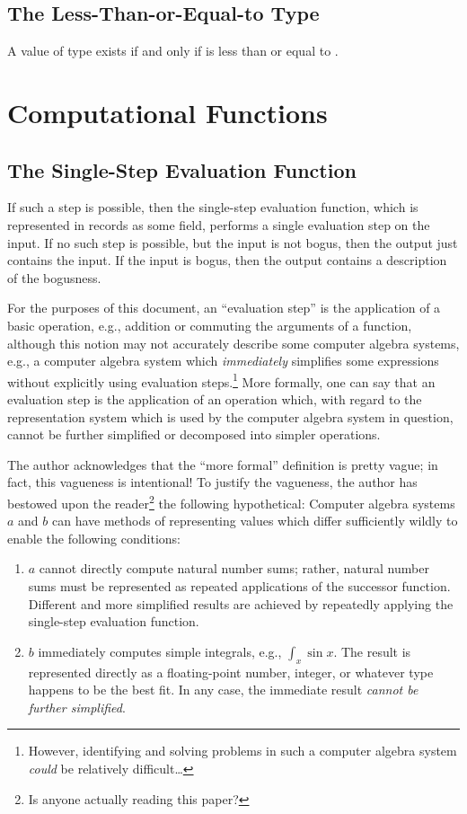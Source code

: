 \documentclass{report}
\begin{document}
\subsection{The Less-Than-or-Equal-to Type}
A value of type    exists if and only if  is less than or equal to .

\section{Computational Functions}

\subsection{The Single-Step Evaluation Function}
If such a step is possible, then the single-step evaluation function, which is represented in  records as some  field, performs a single evaluation step on the input.  If no such step is possible, but the input is not bogus, then the output just contains the input.  If the input is bogus, then the output contains a description of the bogusness.

For the purposes of this document, an ``evaluation step'' is the application of a basic operation, e.g., addition or commuting the arguments of a function, although this notion may not accurately describe some computer algebra systems, e.g., a computer algebra system which \emph{immediately} simplifies some expressions without explicitly using evaluation steps.\footnote{However, identifying and solving problems in such a computer algebra system \emph{could} be relatively difficult\ldots{}}  More formally, one can say that an evaluation step is the application of an operation which, with regard to the representation system which is used by the computer algebra system in question, cannot be further simplified or decomposed into simpler operations.

The author acknowledges that the ``more formal'' definition is pretty vague; in fact, this vagueness is intentional!  To justify the vagueness, the author has bestowed upon the reader\footnote{Is anyone actually reading this paper?} the following hypothetical: Computer algebra systems \(a\) and \(b\) can have methods of representing values which differ sufficiently wildly to enable the following conditions:

\begin{enumerate}
  \item \(a\) cannot directly compute natural number sums; rather, natural number sums must be represented as repeated applications of the successor function.  Different and more simplified results are achieved by repeatedly applying the single-step evaluation function.
  \item \(b\) immediately computes simple integrals, e.g., \(\int_{x} \sin x\).  The result is represented directly as a floating-point number, integer, or whatever type happens to be the best fit.  In any case, the immediate result \emph{cannot be further simplified}.
\end{enumerate}
\end{document}
